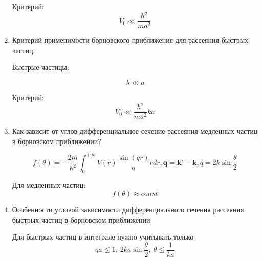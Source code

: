 \documentclass{article}
\begin{document}
\begin{enumerate}
		Критерий:
		\begin{equation}
			V_{0}\ll\frac{\hbar^{2}}{ma^{2}}
		\end{equation}
		
		\item {Критерий применимости борновского приближения для рассеяния быстрых частиц.}
		
		Быстрые частицы:
		
		\begin{equation}
			\lambda\ll a
		\end{equation}
		
		Критерий:
		\begin{equation}
			V_{0}\ll\frac{\hbar^{2}}{ma^{2}}ka
		\end{equation}
		
		\item {Как зависит от углов дифференциальное сечение рассеяния медленных частиц в борновском приближении?}
		
		\begin{equation}
			f(\theta)=-\frac{2m}{\hbar^{2}}\int_{0}^{+\infty}V(r)\frac{\sin(qr)}{q}rdr,\boldsymbol{q=k'-k},q=2k\sin\frac{\theta}{2}
		\end{equation}
		
		Для медленных частиц:
		\begin{equation}
			f(\theta)\approx const
		\end{equation}
		
		\item { Особенности угловой зависимости дифференциального сечения рассеяния быстрых частиц в борновском приближении.}
		
		Для быстрых частиц в интеграле нужно учитывать только
		\begin{equation}
			qa\leq1, \ 2ka\sin\frac{\theta}{2},\ \theta\leq\frac{1}{ka}
		\end{equation}
		
	\end{enumerate}
	
\end{document}
